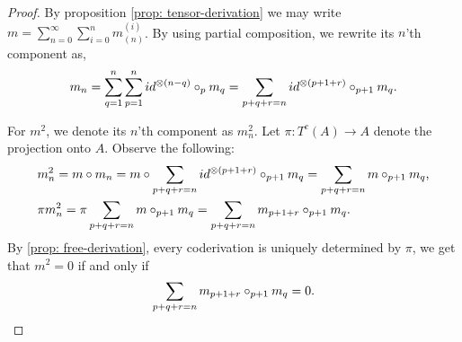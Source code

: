 \documentclass[../thesis.tex]{subfiles}
\begin{document}
        \begin{proof}
            By proposition \ref{prop: tensor-derivation} we may write $m = \sum_{n = 0}^\infty \sum_{i = 0}^n m_{(n)}^{(i)}$. By using partial composition, we rewrite its $n$'th component as,
            \begin{align*}
                m_n = \sum_{q=1}^n\sum_{p = 1}^n id^{\otimes (n-q)}\circ_{p} m_q = \sum_{p + q + r = n}id^{\otimes (p+1+r)}\circ_{p+1}m_q\tt{.}
            \end{align*}

            For $m^2$, we denote its $n$'th component as $m^2_n$. Let $\pi : T^c(A) \rightarrow A$ denote the projection onto $A$. Observe the following:
            \begin{align*}
                & m^2_n = m\circ m_n = m\circ \sum_{p + q + r = n}id^{\otimes (p+1+r)}\circ_{p+1}m_q = \sum_{p + q + r = n}m\circ_{p+1}m_q\tt{,} \\
                & \pi m^2_n = \pi \sum_{p + q + r = n}m\circ_{p+1}m_q = \sum_{p + q + r = n}m_{p+1+r}\circ_{p+1}m_q\tt{.}
            \end{align*}
            By \ref{prop: free-derivation}, every coderivation is uniquely determined by $\pi$, we get that $m^2 = 0$ if and only if
            \begin{align*}
                \sum_{p+q+r = n}m_{p+1+r}\circ_{p+1}m_q = 0\tt{.}
            \end{align*}
        \end{proof}
\end{document}
